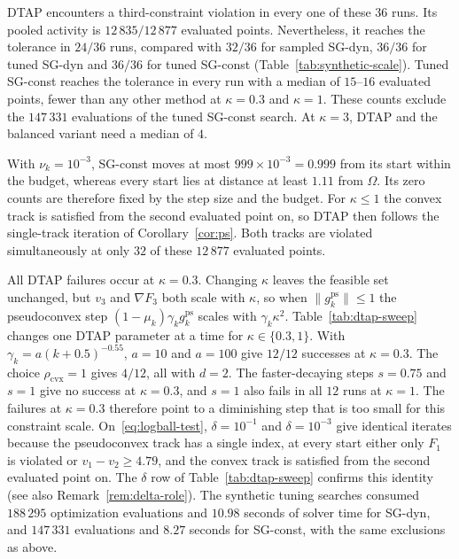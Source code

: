 \documentclass[]{interact}
\theoremstyle{plain}
\theoremstyle{definition}
\theoremstyle{remark}
\newcommand{\cvx}{\mathrm{cvx}}
\newcommand{\ps}{\mathrm{ps}}
\begin{document}
DTAP encounters a third-constraint violation in every one of these $36$ runs. Its pooled activity is $12\,835/12\,877$ evaluated points. Nevertheless, it reaches the tolerance in $24/36$ runs, compared with $32/36$ for sampled SG-dyn, $36/36$ for tuned SG-dyn and $36/36$ for tuned SG-const (Table~\ref{tab:synthetic-scale}). Tuned SG-const reaches the tolerance in every run with a median of $15$--$16$ evaluated points, fewer than any other method at $\kappa=0.3$ and $\kappa=1$. These counts exclude the $147\,331$ evaluations of the tuned SG-const search. At $\kappa=3$, DTAP and the balanced variant need a median of $4$.

With $\nu_k=10^{-3}$, SG-const moves at most $999\times10^{-3}=0.999$ from its start within the budget, whereas every start lies at distance at least $1.11$ from $\Omega$. Its zero counts are therefore fixed by the step size and the budget. For $\kappa\le1$ the convex track is satisfied from the second evaluated point on, so DTAP then follows the single-track iteration of Corollary~\ref{cor:ps}. Both tracks are violated simultaneously at only $32$ of these $12\,877$ evaluated points.

All DTAP failures occur at $\kappa=0.3$. Changing $\kappa$ leaves the feasible set unchanged, but $v_3$ and $\nabla F_3$ both scale with $\kappa$, so when $\|g^{\ps}_k\|\le1$ the pseudoconvex step $(1-\mu_k)\gamma_k g^{\ps}_k$ scales with $\gamma_k\kappa^2$. Table~\ref{tab:dtap-sweep} changes one DTAP parameter at a time for $\kappa\in\{0.3,1\}$. With $\gamma_k=a(k+0.5)^{-0.55}$, $a=10$ and $a=100$ give $12/12$ successes at $\kappa=0.3$. The choice $\rho_{\cvx}=1$ gives $4/12$, all with $d=2$. The faster-decaying steps $s=0.75$ and $s=1$ give no success at $\kappa=0.3$, and $s=1$ also fails in all $12$ runs at $\kappa=1$. The failures at $\kappa=0.3$ therefore point to a diminishing step that is too small for this constraint scale. On~\eqref{eq:logball-test}, $\delta=10^{-1}$ and $\delta=10^{-3}$ give identical iterates because the pseudoconvex track has a single index, at every start either only $F_1$ is violated or $v_1-v_2\ge4.79$, and the convex track is satisfied from the second evaluated point on. The $\delta$ row of Table~\ref{tab:dtap-sweep} confirms this identity (see also Remark~\ref{rem:delta-role}). The synthetic tuning searches consumed $188\,295$ optimization evaluations and $10.98$ seconds of solver time for SG-dyn, and $147\,331$ evaluations and $8.27$ seconds for SG-const, with the same exclusions as above.
\end{document}
